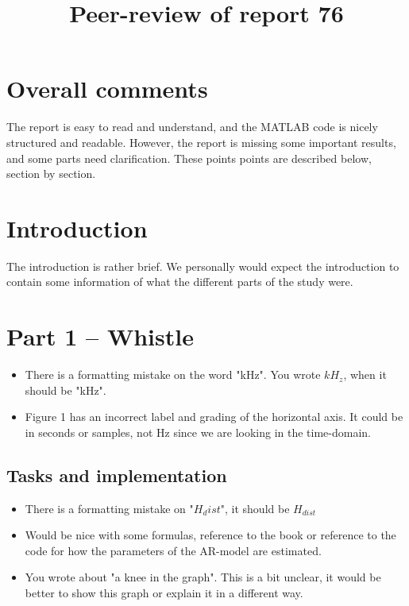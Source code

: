\documentclass[a4paper]{article}
\title{Peer-review of report 76}
\begin{document}
\maketitle

\section{Overall comments}

The report is easy to read and understand, and the MATLAB code is nicely structured and
readable. However, the report is missing some important results, and some parts
need clarification. These points points are described below, section by
section.

\section{Introduction}

The introduction is rather brief. We personally would expect the introduction
to contain some information of what the different parts of the study were.

\section{Part 1 -- Whistle}

\begin{itemize}
    \item There is a formatting mistake on the word "kHz". You wrote $kH_z$, when
it should be "kHz". 
    \item Figure 1 has an incorrect label and grading of the horizontal axis.
        It could be in seconds or samples, not Hz since we are looking in the
        time-domain.
\end{itemize}

\subsection{Tasks and implementation}

\begin{itemize}
    \item There is a formatting mistake on "$H_dist$", it should be $H_{dist}$
    \item Would be nice with some formulas, reference to the book or reference to
    the code for how the parameters of the AR-model are estimated.
    \item You wrote about "a knee in the graph". This is a bit unclear, it
        would be better to show this graph or explain it in a different way.
\end{itemize}
\end{document}
